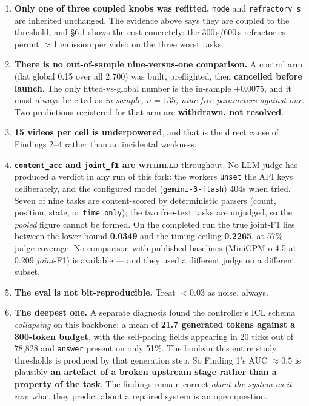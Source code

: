 \documentclass[11pt,a4paper]{article}
\begin{document}
\begin{enumerate}
\item \textbf{Only one of three coupled knobs was refitted.} \texttt{mode} and
\texttt{refractory\_s} are inherited unchanged. The evidence above says they are
coupled to the threshold, and \S6.1 shows the cost concretely: the 300\,s/600\,s
refractories permit $\approx$1 emission per video on the three worst tasks.

\item \textbf{There is no out-of-sample nine-versus-one comparison.} A control arm
(flat global 0.15 over all 2{,}700) was built, preflighted, then \textbf{cancelled
before launch}. The only fitted-vs-global number is the in-sample $+0.0075$, and it
must always be cited as \emph{in sample, $n{=}135$, nine free parameters against
one}. Two predictions registered for that arm are \textbf{withdrawn, not resolved}.

\item \textbf{15 videos per cell is underpowered}, and that is the direct cause of
Findings 2--4 rather than an incidental weakness.

\item \textbf{\texttt{content\_acc} and \texttt{joint\_f1} are \textsc{withheld}}
throughout. No LLM judge has produced a verdict in any run of this fork: the workers
\texttt{unset} the API keys deliberately, and the configured model
(\texttt{gemini-3-flash}) 404s when tried. Seven of nine tasks are content-scored by
deterministic parsers (count, position, state, or \texttt{time\_only}); the two
free-text tasks are unjudged, so the \emph{pooled} figure cannot be formed. On the
completed run the true joint-F1 lies between the lower bound \textbf{0.0349} and the
timing ceiling \textbf{0.2265}, at 57\% judge coverage. No
comparison with published baselines (MiniCPM-o 4.5 at 0.209 \emph{joint}-F1) is
available --- and they used a different judge on a different subset.

\item \textbf{The eval is not bit-reproducible.} Treat $<$0.03 as noise, always.

\item \textbf{The deepest one.} A separate diagnosis found the controller's ICL
schema \emph{collapsing} on this backbone: a mean of \textbf{21.7 generated tokens
against a 300-token budget}, with the self-pacing fields appearing in 20 ticks out of
78{,}828 and \texttt{answer} present on only 51\%. The boolean this entire study
thresholds is produced by that generation step. So Finding 1's AUC $\approx0.5$ is
plausibly \textbf{an artefact of a broken upstream stage rather than a property of
the task}. The findings remain correct \emph{about the system as it ran}; what they
predict about a repaired system is an open question.
\end{enumerate}
\end{document}
